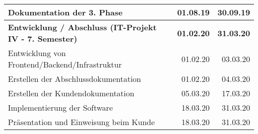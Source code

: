 \begin{table}[htp]
\begin{tabular}{|l|r|r|}
    Dokumentation der 3. Phase                                    & 01.08.19          & 30.09.19 \\ \hline
    \textbf{Entwicklung / Abschluss (IT-Projekt IV - 7. Semester)} & \textbf{01.02.20} & \textbf{31.03.20} \\ \hline
    Entwicklung von Frontend/Backend/Infrastruktur                & 01.02.20          & 03.03.20 \\ \hline
    Erstellen der Abschlussdokumentation                          & 01.02.20          & 04.03.20 \\ \hline
    Erstellen der Kundendokumentation                             & 05.03.20          & 17.03.20 \\ \hline
    Implementierung der Software                                  & 18.03.20          & 31.03.20 \\ \hline
    Präsentation und Einweisung beim Kunde                        & 18.03.20          & 31.03.20 \\ \hline
  \end{tabular}
  \egroup
  \label{tab:zeitplanung}
\end{table}

\newpage

